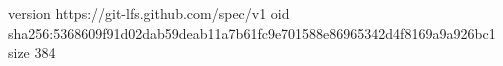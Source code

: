version https://git-lfs.github.com/spec/v1
oid sha256:5368609f91d02dab59deab11a7b61fc9e701588e86965342d4f8169a9a926bc1
size 384
